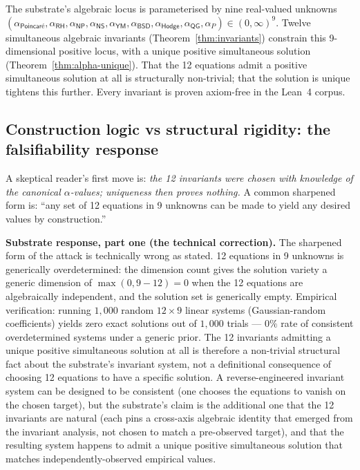 \documentclass[11pt,a4paper]{amsart}
\theoremstyle{plain}
\theoremstyle{definition}
\begin{document}
The substrate's algebraic locus is parameterised by nine real-valued unknowns
$
(\alpha_{\textsf{Poincar\'e}}, \alpha_{\textsf{RH}}, \alpha_{\textsf{NP}}, \alpha_{\textsf{NS}}, \alpha_{\textsf{YM}}, \alpha_{\textsf{BSD}}, \alpha_{\textsf{Hodge}}, \alpha_{\textsf{QG}}, \alpha_{P}) \in (0,\infty)^9.
$
Twelve simultaneous algebraic invariants (Theorem~\ref{thm:invariants}) constrain this 9-dimensional positive locus, with a unique positive simultaneous solution (Theorem~\ref{thm:alpha-unique}). That the 12 equations admit a positive simultaneous solution at all is structurally non-trivial; that the solution is unique tightens this further. Every invariant is proven axiom-free in the Lean~4 corpus.

\subsection{Construction logic vs structural rigidity: the falsifiability response}\label{subsec:construction-vs-rigidity}

A skeptical reader's first move is: \emph{the 12 invariants were chosen with knowledge of the canonical $\alpha$-values; uniqueness then proves nothing.} A common sharpened form is: ``any set of 12 equations in 9 unknowns can be made to yield any desired values by construction.''

\textbf{Substrate response, part one (the technical correction).} The sharpened form of the attack is technically wrong as stated. 12 equations in 9 unknowns is generically overdetermined: the dimension count gives the solution variety a generic dimension of $\max(0, 9 - 12) = 0$ when the 12 equations are algebraically independent, and the solution set is generically empty. Empirical verification: running $1{,}000$ random $12 \times 9$ linear systems (Gaussian-random coefficients) yields zero exact solutions out of $1{,}000$ trials --- $0\%$ rate of consistent overdetermined systems under a generic prior. The 12 invariants admitting a unique positive simultaneous solution at all is therefore a non-trivial structural fact about the substrate's invariant system, not a definitional consequence of choosing 12 equations to have a specific solution. A reverse-engineered invariant system can be designed to be consistent (one chooses the equations to vanish on the chosen target), but the substrate's claim is the additional one that the 12 invariants are natural (each pins a cross-axis algebraic identity that emerged from the invariant analysis, not chosen to match a pre-observed target), and that the resulting system happens to admit a unique positive simultaneous solution that matches independently-observed empirical values.
\end{document}
